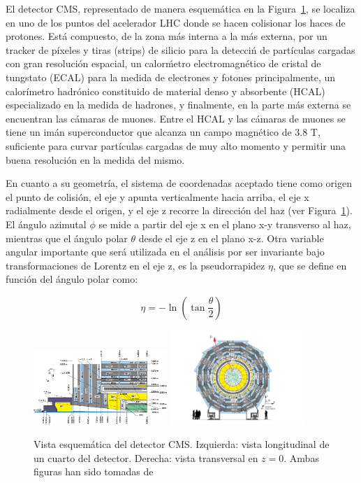 
El detector CMS, representado de manera esquem\'atica en la Figura~\ref{fig:CMS}, se localiza en uno de los puntos del acelerador LHC donde se hacen colisionar los haces de protones. Est\'a compuesto, de la zona m\'as interna a la m\'as externa, por un tracker de p\'ixeles y tiras (strips) de silicio para la detecci\'n de partículas cargadas con gran resoluci\'on espacial, un calor\'metro electromagn\'etico de cristal de tungstato (ECAL) para la medida de electrones y fotones principalmente, un calor\'imetro hadr\'onico constituido de material denso y absorbente (HCAL) especializado en la medida de hadrones, y finalmente, en la parte m\'as externa se encuentran las c\'amaras de muones. Entre el HCAL y las c\'amaras de muones se tiene un im\'an superconductor que alcanza un campo magn\'etico de 3.8 T, suficiente para curvar part\'iculas cargadas de muy alto momento y permitir una buena resoluci\'on en la medida del mismo.

En cuanto a su geometr\'ia, el sistema de coordenadas aceptado tiene como origen el punto de colisi\'on, el eje y apunta verticalmente hacia arriba, el eje x radialmente desde el origen, y el eje z recorre la direcci\'on del haz (ver Figura~\ref{fig:CMS}). El \'angulo azimutal $\phi$ se mide a partir del eje x en el plano x-y transverso al haz, mientras que el \'angulo polar $\theta$ desde el eje z en el plano x-z. Otra variable angular importante que ser\'a utilizada en el an\'alisis por ser invariante bajo transformaciones de Lorentz en el eje z, es la pseudorrapidez $\eta$, que se define en funci\'on del \'angulo polar como:

\begin{equation}
  \eta = -\ln\left(\tan\dfrac{\theta}{2}\right)
\label{eq:eta}
\end{equation}

\begin{figure}
\centering
\includegraphics[width=0.45\textwidth]{figures/CMSview1.png}
\includegraphics[width=0.45\textwidth]{figures/CMSview.png}
\caption{Vista esquem\'atica del detector CMS. Izquierda: vista longitudinal de un cuarto del detector. Derecha: vista transversal en $z = 0$. Ambas figuras han sido tomadas de \cite{DTperformance}}
\label{fig:CMS}
\end{figure}


